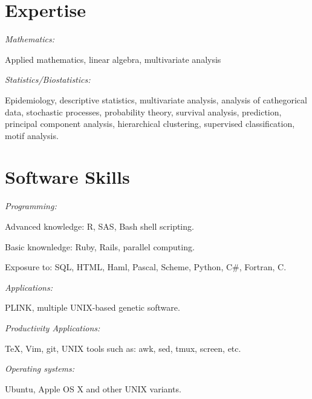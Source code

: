 %
%
\section{Expertise}
\textit{Mathematics:}
\begin{innerlist}
    \item Applied mathematics, linear algebra, multivariate analysis
\end{innerlist}

\halfblankline

\textit{Statistics/Biostatistics:}
\begin{innerlist}
    \item Epidemiology, descriptive statistics, multivariate analysis, analysis of cathegorical data, stochastic processes, probability theory, survival analysis, prediction, principal component analysis, hierarchical clustering, supervised classification, motif analysis.
\end{innerlist}

%
%
\section{Software Skills}
\textit{Programming:}
\begin{innerlist}
    \item Advanced knowledge: R, SAS, Bash shell scripting.
    \item Basic knownledge: Ruby, Rails, parallel computing.
    \item Exposure to: SQL, HTML, Haml, Pascal, Scheme, Python, C\#, Fortran, C.
\end{innerlist}

\halfblankline

\textit{Applications:}
\begin{innerlist}
\item PLINK, multiple UNIX-based genetic software.
\end{innerlist}

\halfblankline

\textit{Productivity Applications:}
\begin{innerlist}
\item \TeX{}, Vim, git, UNIX tools such as: awk, sed, tmux, screen, etc.
\end{innerlist}

\halfblankline

\textit{Operating systems:}
\begin{innerlist}
    \item Ubuntu, Apple OS X and other UNIX variants.
\end{innerlist}


